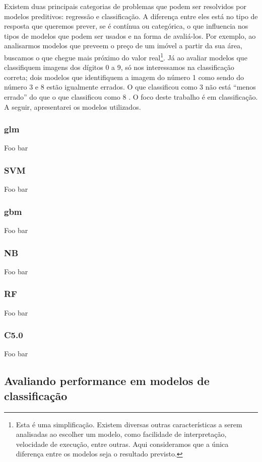 \documentclass[a4paper,titlepage]{ppgi}\usepackage[]{graphicx}\usepackage[]{color}
\begin{document}
Existem duas principais categorias de problemas que podem ser resolvidos por
modelos preditivos: regressão e classificação. A diferença entre eles está no
tipo de resposta que queremos prever, se é contínua ou categórica, o que
influencia nos tipos de modelos que podem ser usados e na forma de avaliá-los.
Por exemplo, ao analisarmos modelos que preveem o preço de um imóvel a partir
da sua área, buscamos o que chegue mais próximo do valor real\footnote{Esta é
uma simplificação. Existem diversas outras características a serem analisadas
ao escolher um modelo, como facilidade de interpretação, velocidade de
execução, entre outras. Aqui consideramos que a única diferença entre os
modelos seja o resultado previsto.}. Já ao avaliar modelos que classifiquem
imagens dos dígitos 0 a 9, só nos interessamos na classificação correta; dois
modelos que identifiquem a imagem do número 1 como sendo do número 3 e 8 estão
igualmente errados. O que classificou como 3 não está ``menos errado'' do que o
que classificou como 8 \cite{Kuhn2013,Zumel2014}. O foco deste trabalho é em
classificação. A seguir, apresentarei os modelos utilizados.

\subsubsection{glm}
Foo bar

\subsubsection{SVM}
Foo bar

\subsubsection{gbm}
Foo bar

\subsubsection{NB}
Foo bar

\subsubsection{RF}
Foo bar

\subsubsection{C5.0}
Foo bar

\subsection{Avaliando performance em modelos de classificação}
\end{document}
